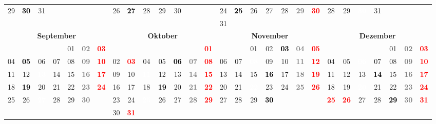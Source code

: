 \documentclass[10pt,a4paper,landscape]{article}
\newcommand{\yb}[1]{\cellcolor{yellow}\textcolor{black}{\bf #1}}
\newcommand{\iv}[1]{\cellcolor{black}\textcolor{white}{\bf #1}}
\newcommand{\rb}[1]{\textbf{\textcolor{red}{#1}}}
\newcommand{\hv}[1]{\textbf{\textcolor{Gray}{#1}}}
\begin{document}
\begin{tabular}{|ccccccc|ccccccc|ccccccc|ccccccc|}
29 & \yb{30} & 31 & & & & & 26 & \yb{27} & 28 & 29 & 30 & & & 24 & \yb{25} & 26 & 27 & 28 & \hv{29} & \rb{30} & 28 & 29 & \iv{30} & 31 & & &  \\
& & & & & & & & & & & & & & 31 & & & & & & & & & & & & &  \\
\hline
\multicolumn{7}{|c|}{\bf September} & \multicolumn{7}{|c|}{\bf Oktober} & \multicolumn{7}{|c|}{\bf November} & \multicolumn{7}{|c|}{\bf Dezember} \\
& & & & 01 & \hv{02} & \rb{03} & & & & & & & \rb{01} & & & 01 & 02 & \yb{03} & \hv{04} & \rb{05} & & & & & 01 & \hv{02} & \rb{03} \\
04 & \yb{05} & 06 & 07 & 08 & \hv{09} & \rb{10} & 02 & \rb{03} & 04 & 05 & \yb{06} & \hv{07} & \rb{08} & 06 & 07 & \iv{08} & 09 & 10 & \hv{11} & \rb{12} & 04 & 05 & \iv{06} & 07 & 08 & \hv{09} & \rb{10} \\
11 & 12 & \iv{13} & 14 & 15 & \hv{16} & \rb{17} & 09 & 10 & \iv{11} & 12 & 13 & \hv{14} & \rb{15} & 13 & 14 & 15 & \yb{16} & 17 & \hv{18} & \rb{19} & 11 & 12 & 13 & \yb{14} & 15 & \hv{16} & \rb{17} \\
18 & \yb{19} & 20 & 21 & 22 & \hv{23} & \rb{24} & 16 & 17 & 18 & \yb{19} & 20 & \hv{21} & \rb{22} & 20 & 21 & \iv{22} & 23 & 24 & \hv{25} & \rb{26} & 18 & 19 & \iv{20} & 21 & 22 & \hv{23} & \rb{24} \\
25 & 26 & \iv{27} & 28 & 29 & \hv{30} & & 23 & 24 & \iv{25} & 26 & 27 & \hv{28} & \rb{29} & 27 & 28 & 29 & \yb{30} & & & & \rb{25} & \rb{26} & 27 & 28 & \yb{29} & \hv{30} & \rb{31} \\
& & & & & & & 30 & \rb{31} & & & & & & & & & & & & & & & & & & &  \\
\hline
\end{tabular}
\end{document}
